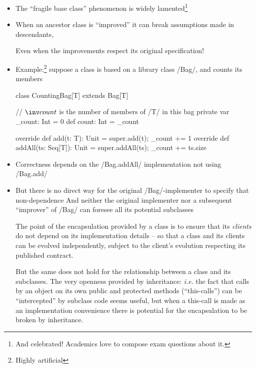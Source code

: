 \documentclass{ip3}
\begin{document}
\begin{foil}
\begin{itemize}
\item The ``fragile base class'' phenomenon is widely lamented\footnote{And celebrated! 
Academics love to compose exam questions about it.}
\item When an ancestor class is ``improved'' it can break assumptions made in descendants,
      
      Even when the improvements respect its original specification!
      
\item Example:\footnote{Highly artificial} suppose a class is based on a library class \sc/Bag/, and counts its members
\begin{-scala}

        class CountingBag[T] extends Bag[T] {
          // $\inv count$ is the number of members of \sc/T/ in this bag
          private var _count: Int = 0
                  def count:  Int = _count
          
          override def add(t: T): Unit          = { super.add(t);     _count += 1 }
          override def addAll(ts: Seq[T]): Unit = { super.addAll(ts); _count += ts.size }          
        }
\end{-scala}
\item   Correctness depends on the \sc/Bag.addAll/ implementation not using \sc/Bag.add/
\item   But there is no direct way for the original \sc/Bag/-implementer to specify that non-dependence
\vitem  And neither the original implementer nor a subsequent ``improver'' of \sc/Bag/ can 
        foresee all its potential subclasses
\begin{note}
The point of the encapsulation provided by a class is to ensure that
its \textit{clients} do not depend on its implementation details --
so that a class and its clients can be evolved independently, subject to
the client's evolution respecting its published contract.

But the same does not hold for the relationship between a class and its
subclasses. The very openness provided by inheritance: \textit{i.e.} the
fact that calls by an object on its own public and protected methods
(``this-calls'') can be ``intercepted'' by subclass code seems useful, but
when a this-call is made as an implementation convenience there is
potential for the encapsulation to be broken by inheritance.


\end{note}
\end{itemize} 
\end{foil}
\end{document}
